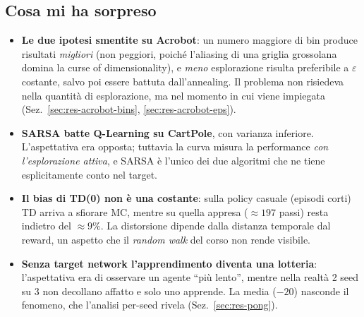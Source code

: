 \subsection{Cosa mi ha sorpreso}
\begin{itemize}
  \item \textbf{Le due ipotesi smentite su Acrobot}: un numero maggiore di bin produce
        risultati \emph{migliori} (non peggiori, poich\'e l'aliasing di una griglia
        grossolana domina la curse of dimensionality), e \emph{meno} esplorazione risulta
        preferibile a $\varepsilon$ costante, salvo poi essere battuta dall'annealing. Il
        problema non risiedeva nella quantit\`a di esplorazione, ma nel momento in cui
        viene impiegata (Sez.~\ref{sec:res-acrobot-bins}, \ref{sec:res-acrobot-eps}).
  \item \textbf{SARSA batte Q\hbox{-}Learning su CartPole}, con varianza inferiore.
        L'aspettativa era opposta; tuttavia la curva misura la performance \emph{con
        l'esplorazione attiva}, e SARSA \`e l'unico dei due algoritmi che ne tiene
        esplicitamente conto nel target.
  \item \textbf{Il bias di TD(0) non \`e una costante}: sulla policy casuale (episodi
        corti) TD arriva a sfiorare MC, mentre su quella appresa ($\approx 197$ passi)
        resta indietro del $\approx 9\%$. La distorsione dipende dalla distanza temporale
        dal reward, un aspetto che il \emph{random walk} del corso non rende visibile.
  \item \textbf{Senza target network l'apprendimento diventa una lotteria}: l'aspettativa
        era di osservare un agente ``pi\`u lento'', mentre nella realt\`a 2 seed su 3 non
        decollano affatto e solo uno apprende. La media ($-20$) nasconde il fenomeno,
        che l'analisi per-seed rivela (Sez.~\ref{sec:res-pong}).
\end{itemize}

